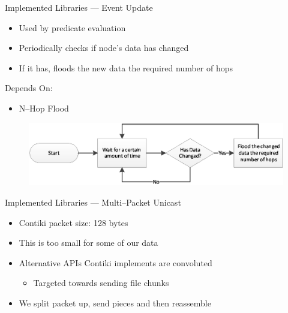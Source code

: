 \documentclass[usenames,dvipsnames]{beamer}
\begin{document}
\begin{frame}{Implemented Libraries --- Event Update}
	\begin{itemize}
		\item Used by predicate evaluation
		\item Periodically checks if node's data has changed
		\item If it has, floods the new data the required number of hops
	\end{itemize}
\vspace{1em}
Depends On:
	\begin{itemize}
		\item N--Hop Flood
	\end{itemize}

\begin{figure}[H]
	\centering
	\includegraphics[width=\textwidth]{../Report/Diagrams/event-update-flowchart.eps}
\end{figure}

\end{frame}

\begin{frame}{Implemented Libraries --- Multi--Packet Unicast}
	\begin{itemize}
		\item Contiki packet size: 128 bytes
		\item This is too small for some of our data
		\item Alternative APIs Contiki implements are convoluted
			\begin{itemize}
				\item Targeted towards sending file chunks
			\end{itemize}
		\item We split packet up, send pieces and then reassemble
	\end{itemize}
\end{frame}
\end{document}
